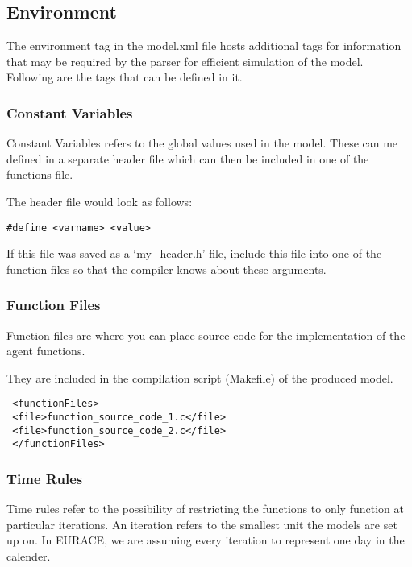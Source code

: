 \subsection{Environment}
The environment tag in the model.xml file hosts additional tags for information that may be required by
the parser for efficient simulation of the model.
Following are the tags that can be defined in it.


\subsubsection{Constant Variables}

Constant Variables refers to the global values used in the model.
These can me defined in a separate header file which can then be included in one of the functions file.

The header file would look as follows:

\begin{mylisting}
\begin{verbatim}
#define <varname> <value>
\end{verbatim}
\end{mylisting}

If this file was saved as a `my\_header.h' file, include this file into one of
the function files so that the compiler knows about these arguments.

\subsubsection{Function Files}

Function files are where you can place source code for the implementation of the agent functions.

They are included in the compilation script (Makefile) of the produced model.

\begin{mylisting}
\begin{verbatim}
 <functionFiles>
 <file>function_source_code_1.c</file>
 <file>function_source_code_2.c</file>
 </functionFiles>
\end{verbatim}
\end{mylisting}

\subsubsection{Time Rules}

Time rules refer to the possibility of restricting the functions to only function at particular iterations. An iteration refers to the smallest unit the models are set up on. In EURACE, we are assuming every iteration to represent one day in the calender.

